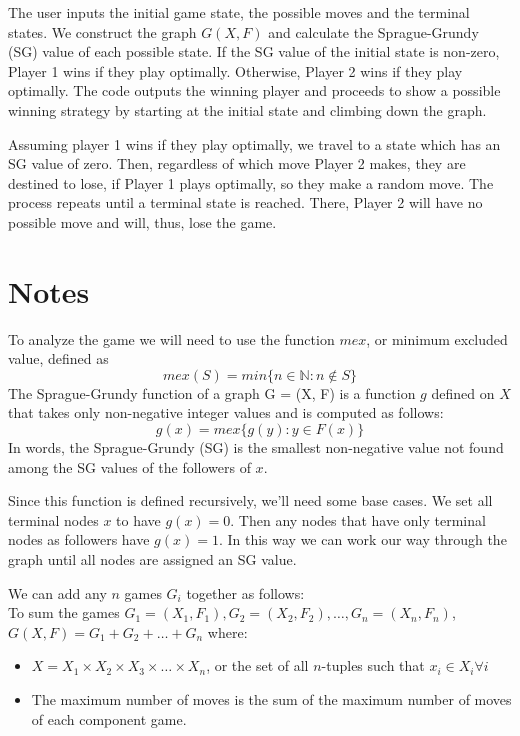 \documentclass{article}
\begin{document}
The user inputs the initial game state, the possible moves and the terminal states. We construct the graph $G(X, F)$ and calculate the Sprague-Grundy (SG) value of each possible state. If the SG value of the initial state is non-zero, Player 1 wins if they play optimally. Otherwise, Player 2 wins if they play optimally. The code outputs the winning player and proceeds to show a possible winning strategy by starting at the initial state and climbing down the graph.

Assuming player 1 wins if they play optimally, we travel to a state which has an SG value of zero. Then, regardless of which move Player 2 makes, they are destined to lose, if Player 1 plays optimally, so they make a random move. The process repeats until a terminal state is reached. There, Player 2 will have no possible move and will, thus, lose the game. 

\section{Notes\cite{mit}}

To analyze the game we will need to use the function $mex$, or minimum excluded value, defined as
$$mex(S) = min{\{}n \in \mathbb{N} : n \notin S{\}}$$
The Sprague-Grundy function of a graph G = (X, F) is a function $g$ defined on $X$ that takes only non-negative integer values and is computed as follows:
$$g(x) = mex{\{}g(y) : y \in F(x){\}}$$
In words, the Sprague-Grundy (SG) is the smallest non-negative value not found among the SG values of the followers of $x$.

Since this function is defined recursively, we’ll need some base cases. We set all terminal nodes $x$ to have $g(x) = 0$. Then any nodes that have only terminal nodes as followers have $g(x) = 1$. In this way we can work our way through the graph until all nodes are assigned an SG value.

We can add any $n$ games $G_i$ together as follows:\\
To sum the games $G_1 = (X_1, F_1), G_2 = (X_2, F_2), \dots, G_n = (X_n, F_n)$,\\
$G(X, F) = G_1 + G_2 + \dots + G_n$ where:
\begin{itemize}
\item $X = X_1 \times X_2 \times X_3 \times \dots \times X_n$, or the set of all $n$-tuples such that $x_i \in X_i \forall i$
\item The maximum number of moves is the sum of the maximum number
of moves of each component game.
\end{itemize}
\end{document}
